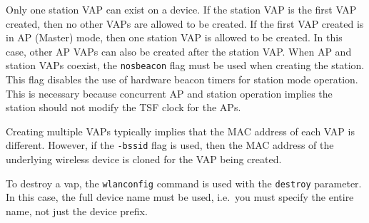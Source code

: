 \documentclass[10pt,fullpage]{article}
\newcommand{\mytt}[1]{{\texttt{#1}}}
\begin{document}
Only one station VAP can exist on a device.  If the station VAP is the
first VAP created, then no other VAPs are allowed to be created. If
the first VAP created is in AP (Master) mode, then one station VAP is
allowed to be created.  In this case, other AP VAPs can also be
created after the station VAP.  When AP and station VAPs coexist, the
\mytt{nosbeacon} flag must be used when creating the station.  This
flag disables the use of hardware beacon timers for station mode
operation.  This is necessary because concurrent AP and station
operation implies the station should not modify the TSF clock for the
APs.

Creating multiple VAPs typically implies that the MAC address of each
VAP is different.  However, if the \mytt{-bssid} flag is used, then
the MAC address of the underlying wireless device is cloned for the
VAP being created.

To destroy a vap, the \mytt{wlanconfig} command is used with the
\mytt{destroy} parameter.  In this case, the full device name must be
used, i.e.\ you must specify the entire name, not just the device
prefix.
\end{document}
